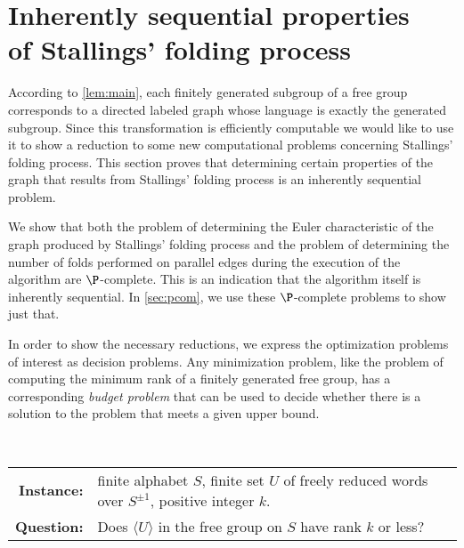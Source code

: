 \documentclass{elsarticlenonatbib}
\newcommand{\FGR}{\textsc{Free Group Rank}}
\newcommand{\gen}[1]{\langle #1 \rangle}
\newcommand{\Spm}{S^{\pm1}}
\begin{document}
\section[Inherently sequential properties of Stallings' folding process]{Inherently sequential properties \\ of Stallings' folding process}

According to \autoref{lem:main}, each finitely generated subgroup of a free group corresponds to a directed labeled graph whose language is exactly the generated subgroup.
Since this transformation is efficiently computable we would like to use it to show a reduction to some new computational problems concerning Stallings' folding process.
%
%
This section proves that determining certain properties of the graph that results from Stallings' folding process is an inherently sequential problem.

%
We show that both the problem of determining the Euler characteristic of the graph produced by Stallings' folding process and the problem of determining the number of folds performed on parallel edges during the execution of the algorithm are $\P$-complete.
This is an indication that the algorithm itself is inherently sequential.
In \autoref{sec:pcom}, we use these $\P$-complete problems to show just that.

In order to show the necessary reductions, we express the optimization problems of interest as decision problems.
Any minimization problem, like the problem of computing the minimum rank of a finitely generated free group, has a corresponding \emph{budget problem} that can be used to decide whether there is a solution to the problem that meets a given upper bound.

\begin{definition}[\FGR]
  \mbox{} \\
  \begin{tabular}{r p{9.5cm}}
    \textbf{Instance:} & finite alphabet $S$, finite set $U$ of freely reduced words over $\Spm$, positive integer $k$. \\
    \textbf{Question:} & Does $\gen{U}$ in the free group on $S$ have rank $k$ or less?
  \end{tabular}
\end{definition}
\end{document}
